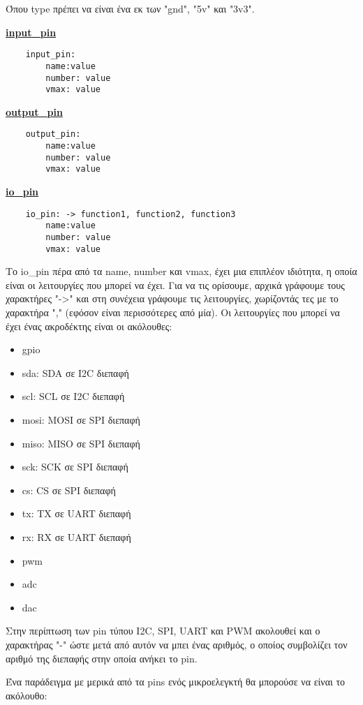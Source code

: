 Όπου type πρέπει να είναι ένα εκ των "gnd", "5v" και "3v3".

\textbf{\underline{input\_pin}}

\begin{lstlisting}
	input_pin:
		name:value
		number: value
		vmax: value
\end{lstlisting}

\textbf{\underline{output\_pin}}

\begin{lstlisting}
	output_pin:
		name:value
		number: value
		vmax: value
\end{lstlisting}

\textbf{\underline{io\_pin}}

\begin{lstlisting}
	io_pin: -> function1, function2, function3
		name:value
		number: value
		vmax: value
\end{lstlisting}

Το io\_pin πέρα από τα name, number και vmax, έχει μια επιπλέον ιδιότητα, η οποία είναι οι λειτουργίες που μπορεί να έχει. Για να τις ορίσουμε, αρχικά γράφουμε τους χαρακτήρες "->" και στη συνέχεια γράφουμε τις λειτουργίες, χωρίζοντάς τες με το χαρακτήρα "," (εφόσον είναι περισσότερες από μία). Οι λειτουργίες που μπορεί να έχει ένας ακροδέκτης είναι οι ακόλουθες:

\begin{itemize}
	\item gpio
	\item sda: SDA σε I2C διεπαφή
	\item scl: SCL σε I2C διεπαφή
	\item mosi: MOSI σε SPI διεπαφή
	\item miso: MISO σε SPI διεπαφή
	\item sck: SCK σε SPI διεπαφή
	\item cs: CS σε SPI διεπαφή
	\item tx: TX σε UART διεπαφή
	\item rx: RX σε UART διεπαφή
	\item pwm
	\item adc
	\item dac
\end{itemize}

Στην περίπτωση των pin τύπου I2C, SPI, UART και PWM ακολουθεί και ο χαρακτήρας "-" ώστε μετά από αυτόν να μπει ένας αριθμός, ο οποίος συμβολίζει τον αριθμό της διεπαφής στην οποία ανήκει το pin.

Ένα παράδειγμα με μερικά από τα pins ενός μικροελεγκτή θα μπορούσε να είναι το ακόλουθο:

